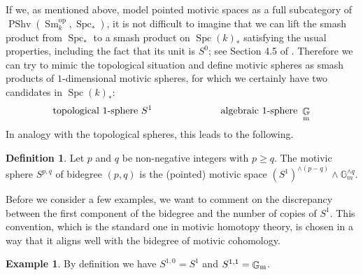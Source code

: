\documentclass[english]{amsart}
\theoremstyle{definition}
\newtheorem{de}[prop]{Definition}
\newtheorem{ex}[prop]{Example}
\DeclareMathOperator{\G}{\mathbb{G}}
\DeclareMathOperator{\op}{op}
\DeclareMathOperator{\Spc}{Spc}
\DeclareMathOperator{\Sm}{Sm}
\DeclareMathOperator{\PShv}{PShv}
\begin{document}
If we, as mentioned above, model pointed motivic spaces as a full subcategory of $\PShv(\Sm_k^{\op},\Spc_*)$, it is not difficult to imagine that we can lift the smash product from $\Spc_*$ to a smash product on $\Spc(k)_*$ satisfying the usual properties, including the fact that its unit is $S^0$; see Section 4.5 of \cite{MR3727503}. Therefore we can try to mimic the topological situation and define motivic spheres as smash products of $1$-dimensional motivic spheres, for which we certainly have two candidates in $\Spc(k)_*$:
$$\text{topological }1\text{-sphere }S^1 \hspace{70pt} \text{algebraic }1\text{-sphere }\G_{\rm m}$$
In analogy with the topological spheres, this leads to the following.
\begin{de}
Let $p$ and $q$ be non-negative integers with $p \geq q$. The motivic sphere $S^{p,q}$ of bidegree $(p,q)$ is the (pointed) motivic space $(S^1)^{\wedge (p-q)} \wedge \mathbb{G}_m^{\wedge q}.$
\end{de}
Before we consider a few examples, we want to comment on the discrepancy between the first component of the bidegree and the number of copies of $S^1$. This convention, which is the standard one in motivic homotopy theory, is chosen in a way that it aligns well with the bidegree of motivic cohomology.
\begin{ex}
By definition we have $S^{1,0} = S^1$ and $S^{1,1} = \G_{\rm m}$.
\end{ex}
\end{document}
